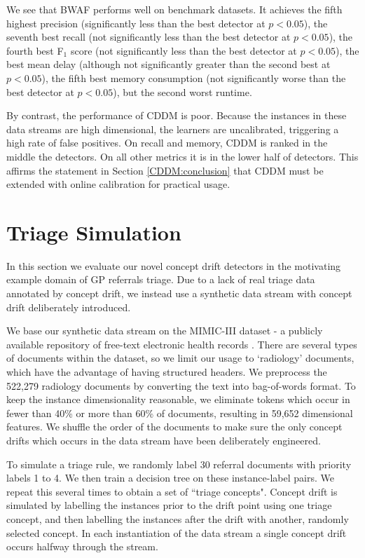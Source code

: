 We see that BWAF performs well on benchmark datasets. It achieves the fifth highest precision (significantly less than the best detector at $p<0.05$), the seventh best recall (not significantly less than the best detector at $p<0.05$), the fourth best F$_1$ score (not significantly less than the best detector at $p<0.05$), the best mean delay (although not significantly greater than the second best at $p<0.05$), the fifth best memory consumption (not significantly worse than the best detector at $p<0.05$), but the second worst runtime.

By contrast, the performance of CDDM is poor. Because the instances in these data streams are high dimensional, the learners are uncalibrated, triggering a high rate of false positives. On recall and memory, CDDM is ranked in the middle the detectors. On all other metrics it is in the lower half of detectors. This affirms the statement in Section \ref{CDDM:conclusion} that CDDM must be extended with online calibration for practical usage.


\section{Triage Simulation} \label{Experiments:triage}

In this section we evaluate our novel concept drift detectors in the motivating example domain of GP referrals triage. Due to a lack of real triage data annotated by concept drift, we instead use a synthetic data stream with concept drift deliberately introduced.

We base our synthetic data stream on the MIMIC-III dataset - a publicly available repository of free-text electronic health records \cite{mimic}. There are several types of documents within the dataset, so we limit our usage to `radiology' documents, which have the advantage of having structured headers. We preprocess the 522,279 radiology documents by converting the text into bag-of-words format. To keep the instance dimensionality reasonable, we eliminate tokens which occur in fewer than 40\% or more than 60\% of documents, resulting in 59,652 dimensional features. We shuffle the order of the documents to make sure the only concept drifts which occurs in the data stream have been deliberately engineered.

To simulate a triage rule, we randomly label 30 referral documents with priority labels 1 to 4. We then train a decision tree on these instance-label pairs. We repeat this several times to obtain a set of ``triage concepts". Concept drift is simulated by labelling the instances prior to the drift point using one triage concept, and then labelling the instances after the drift with another, randomly selected concept. In each instantiation of the data stream a single concept drift occurs halfway through the stream.

